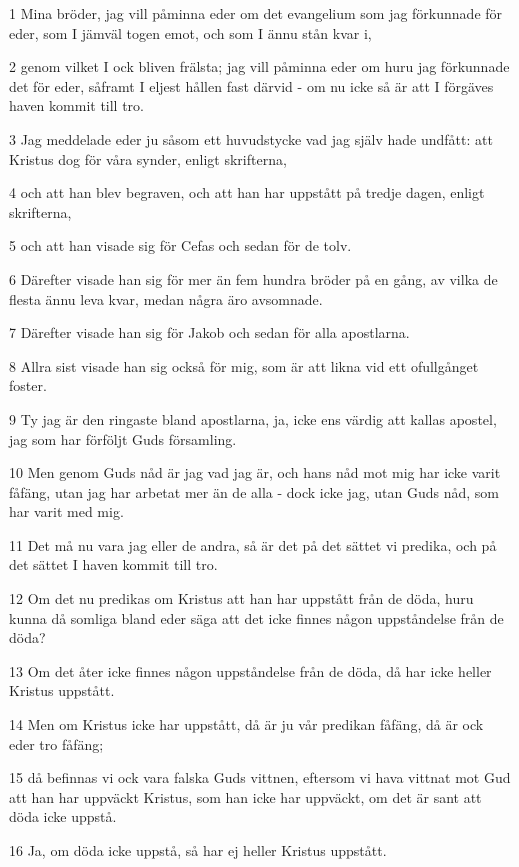 \par 1 Mina bröder, jag vill påminna eder om det evangelium som jag förkunnade för eder, som I jämväl togen emot, och som I ännu stån kvar i,
\par 2 genom vilket I ock bliven frälsta; jag vill påminna eder om huru jag förkunnade det för eder, såframt I eljest hållen fast därvid - om nu icke så är att I förgäves haven kommit till tro.
\par 3 Jag meddelade eder ju såsom ett huvudstycke vad jag själv hade undfått: att Kristus dog för våra synder, enligt skrifterna,
\par 4 och att han blev begraven, och att han har uppstått på tredje dagen, enligt skrifterna,
\par 5 och att han visade sig för Cefas och sedan för de tolv.
\par 6 Därefter visade han sig för mer än fem hundra bröder på en gång, av vilka de flesta ännu leva kvar, medan några äro avsomnade.
\par 7 Därefter visade han sig för Jakob och sedan för alla apostlarna.
\par 8 Allra sist visade han sig också för mig, som är att likna vid ett ofullgånget foster.
\par 9 Ty jag är den ringaste bland apostlarna, ja, icke ens värdig att kallas apostel, jag som har förföljt Guds församling.
\par 10 Men genom Guds nåd är jag vad jag är, och hans nåd mot mig har icke varit fåfäng, utan jag har arbetat mer än de alla - dock icke jag, utan Guds nåd, som har varit med mig.
\par 11 Det må nu vara jag eller de andra, så är det på det sättet vi predika, och på det sättet I haven kommit till tro.
\par 12 Om det nu predikas om Kristus att han har uppstått från de döda, huru kunna då somliga bland eder säga att det icke finnes någon uppståndelse från de döda?
\par 13 Om det åter icke finnes någon uppståndelse från de döda, då har icke heller Kristus uppstått.
\par 14 Men om Kristus icke har uppstått, då är ju vår predikan fåfäng, då är ock eder tro fåfäng;
\par 15 då befinnas vi ock vara falska Guds vittnen, eftersom vi hava vittnat mot Gud att han har uppväckt Kristus, som han icke har uppväckt, om det är sant att döda icke uppstå.
\par 16 Ja, om döda icke uppstå, så har ej heller Kristus uppstått.
